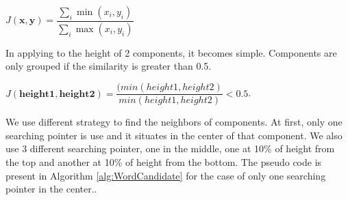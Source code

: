 \begin{center}
    $J(\mathbf{x}, \mathbf{y}) = \dfrac{\sum_i \min(x_i, y_i)}{\sum_i \max(x_i, y_i)}$ 
\end{center}
    
In applying to the height of 2 components, it becomes simple. Components are only grouped if the similarity is greater than 0.5.

\begin{center}
$J(\mathbf{height1},\mathbf{height2}) = \dfrac{(min(height1,height2)}{min(height1,height2)} < 0.5$. 
\end{center}


\par We use different strategy to find the neighbors of components. At first, only one searching pointer is use and it situates in the center of that component. We also use 3 different searching pointer, one in the middle, one at 10\% of height from the top and another at 10\% of height from the bottom. 
The pseudo code is present in Algorithm \ref{alg:WordCandidate} for the case of only one searching pointer in the center..

